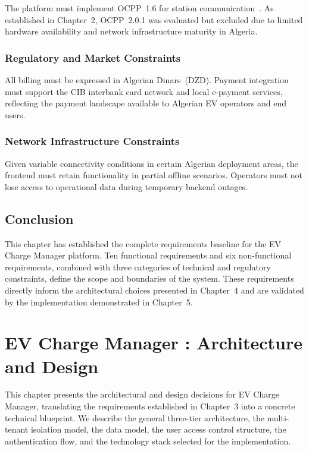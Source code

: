 \documentclass[12pt,a4paper]{report}
\begin{document}
The platform must implement OCPP~1.6 for station communication~\autocite{ocpp16_ed2}. As
established in Chapter~2, OCPP~2.0.1 was evaluated but excluded due to limited hardware
availability and network infrastructure maturity in Algeria.

\subsection{Regulatory and Market Constraints}

All billing must be expressed in Algerian Dinars~(DZD). Payment integration must support the
CIB interbank card network and local e-payment services, reflecting the payment landscape
available to Algerian EV operators and end users.

\subsection{Network Infrastructure Constraints}

Given variable connectivity conditions in certain Algerian deployment areas, the frontend must
retain functionality in partial offline scenarios. Operators must not lose access to operational
data during temporary backend outages.

\section{Conclusion}

This chapter has established the complete requirements baseline for the EV Charge Manager
platform. Ten functional requirements and six non-functional requirements, combined with three
categories of technical and regulatory constraints, define the scope and boundaries of the
system. These requirements directly inform the architectural choices presented in Chapter~4 and
are validated by the implementation demonstrated in Chapter~5.


\chapter{EV Charge Manager : Architecture and Design}

This chapter presents the architectural and design decisions for EV Charge Manager, translating
the requirements established in Chapter~3 into a concrete technical blueprint. We describe the
general three-tier architecture, the multi-tenant isolation model, the data model, the user
access control structure, the authentication flow, and the technology stack selected for the
implementation.
\end{document}
